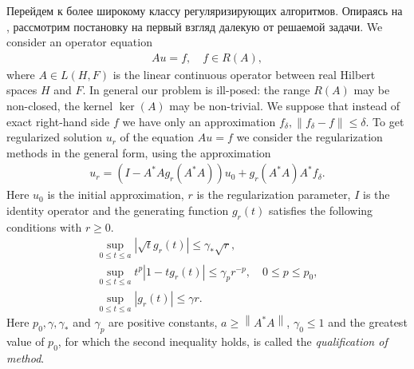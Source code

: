\documentclass[10pt]{article}
\theoremstyle{definition}
\theoremstyle{remark}
\theoremstyle{plain}
\begin{document}
Перейдем к более широкому классу регуляризирующих алгоритмов. 
Опираясь на \cite{Raus&Hamarik}, рассмотрим постановку на первый взгляд далекую от решаемой задачи. 
We consider an operator equation 
\begin{align}
A u = f,\quad f\in R(A), \label{system_gen}
\end{align}
where $A \in L(H,F)$ is the linear continuous operator between real Hilbert spaces $H$ and $F$. In general our problem is ill-posed: the range $R(A)$ may be non-closed, the kernel $\ker(A)$ may be non-trivial. We suppose that instead of exact right-hand side $f$ we have only an approximation $f_\delta, \|f_\delta - f\|\leqslant\delta$. To get regularized solution $u_r$ of the equation $Au = f$ we consider the regularization methods in the general form, using the approximation
\begin{align}
u_r = (I-A^*Ag_r(A^*A))u_0+g_r(A^*A)A^*f_\delta. \label{reg_gen_meth}
\end{align}
Here $u_0$ is the initial approximation, $r$ is the regularization parameter, $I$ is the identity operator and the generating function $g_r(t)$ satisfies the following conditions with $r\geqslant0$.
\begin{gather*}
\sup\limits_{0\leqslant t\leqslant a}
	\left|\sqrt{t}g_r(t)\right| \leqslant \gamma_*\sqrt{r},  
\\
\sup\limits_{0\leqslant t\leqslant a}
	t^p\left|1-t g_r(t)\right| \leqslant\gamma_p r^{-p}, 
		\quad 0\leqslant p\leqslant p_0 ,
\\
\sup\limits_{0\leqslant t\leqslant a}
	\left|g_r(t)\right| \leqslant\gamma r.
\end{gather*}
Here $p_0,\gamma,\gamma_*$ and $\gamma_p$ are positive constants, $a\geqslant \left\|A^*A\right\|$, $\gamma_0\leqslant 1$ and the greatest value of $p_0$, for which the second inequality holds, is called the \emph{qualification of method}. 
\end{document}
